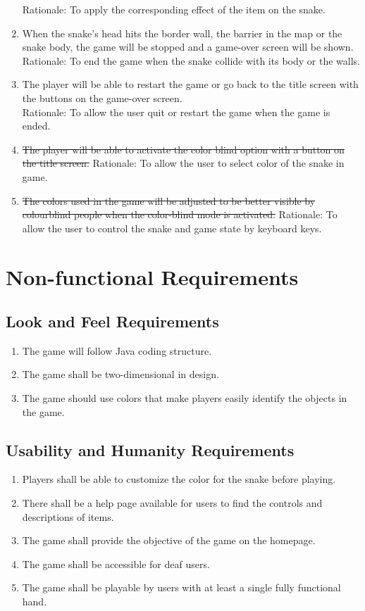 \documentclass[12pt, titlepage]{article}
\begin{document}
\begin{enumerate}[{FR}1.]
        \color{red} Rationale: To apply the corresponding effect of the item on the snake. \color{black}
    \item When the snake's head hits the border wall, the barrier in the map or the snake body, the game will be stopped and a game-over screen will be shown.\\
        \color{red} Rationale: To end the game when the snake collide with its body or the walls. \color{black}
    \item The player will be able to restart the game or go back to the title screen with the buttons on the game-over screen.\\
        \color{red} Rationale: To allow the user quit or restart the game when the game is ended. \color{black}
    \item \sout{The player will be able to activate the color blind option with a button on the title screen.}
        \color{red} Rationale: To allow the user to select color of the snake in game. \color{black}
    \item \sout{The colors used in the game will be adjusted to be better visible by  colourblind people when the color-blind mode is activated.}
        \color{red} Rationale: To allow the user to control the snake and game state by keyboard keys. \color{black}
\end{enumerate}
\section{Non-functional Requirements}

\subsection{Look and Feel Requirements}
\begin{enumerate}[{LF}1. ]
	\item The game will follow Java coding structure.
	\item The game shall be two-dimensional in design.
	\item The game should use colors that make players  easily identify the objects in the game.
\end{enumerate}
\subsection{Usability and Humanity Requirements}
\begin{enumerate}[{UH}1. ]
	\item  Players shall be able to customize the color for the snake before playing.
	\item There shall be a help page available for users to find the controls and descriptions of items.
	\item The game shall provide the objective of the game on the homepage.
	\item The game shall be accessible for deaf users.
	\item The game shall be playable by users with at least a single fully functional hand.
\end{enumerate}
\end{document}
